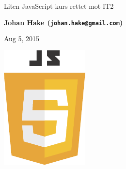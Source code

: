 \documentclass[%
oneside,                 %
final,                   %
12pt]{article}
\begin{document}






\thispagestyle{empty}

\begin{center}
{\LARGE\bf
\begin{spacing}{1.25}
Liten JavaScript kurs rettet mot IT2
\end{spacing}
}
\end{center}


\begin{center}
{\bf Johan Hake${}^{}$ (\texttt{johan.hake@gmail.com})} \\ [0mm]
\end{center}

\begin{center}
\end{center}
    

\begin{center} %
Aug 5, 2015
\end{center}

\vspace{1cm}


\centerline{\includegraphics[width=0.5\linewidth]{figures/javascript-seeklogo.pdf}}
\end{document}

